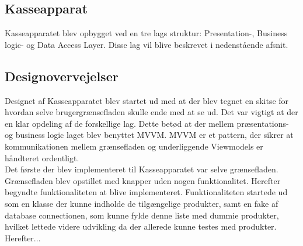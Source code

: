 \subsection{Kasseapparat}

Kasseapparatet blev opbygget ved en tre lags struktur: Presentation-, Business logic- og Data Access Layer. Disse lag vil blive beskrevet i nedenstående afsnit.

\subsection{Designovervejelser}
Designet af Kasseapparatet blev startet ud med at der blev tegnet en skitse for hvordan selve brugergrænsefladen skulle ende med at se ud.
Det var vigtigt at der en klar opdeling af de forskellige lag. Dette betød at der mellem præsentations- og business logic laget blev benyttet MVVM. MVVM er et pattern, der sikrer at kommunikationen mellem grænsefladen og underliggende Viewmodels er håndteret ordentligt. \\
Det første der blev implementeret til Kasseapparatet var selve grænsefladen. Grænsefladen blev opstillet med knapper uden nogen funktionalitet. Herefter begyndte funktionaliteten at blive implementeret. Funktionaliteten startede ud som en klasse der kunne indholde de tilgængelige produkter, samt en fake af database connectionen, som kunne fylde denne liste med dummie produkter, hvilket lettede videre udvikling da der allerede kunne testes med produkter. Herefter...





